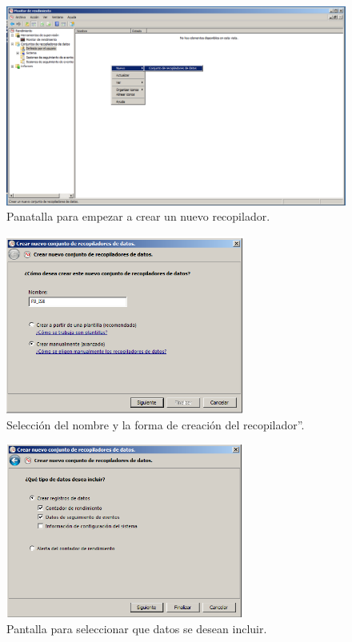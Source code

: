 \begin{figure}[H]
  \begin{center}
    \includegraphics[width=1\textwidth]{imagenes/rec1}
    \caption{Panatalla para empezar a crear un nuevo recopilador.}
    \label{fig5}
  \end{center}
\end{figure}

\begin{figure}[H]
  \begin{center}
    \includegraphics[width=0.7\textwidth]{imagenes/rec2}
    \caption{Selección del nombre y la forma de creación del recopilador”.}
    \label{fig6}
  \end{center}
\end{figure}

\begin{figure}[H]
  \begin{center}
    \includegraphics[width=0.7\textwidth]{imagenes/rec3}
    \caption{Pantalla para seleccionar que datos se desean incluir.}
    \label{fig7}
  \end{center}
\end{figure}

